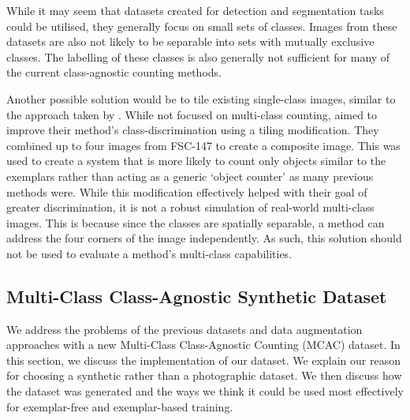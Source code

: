 \documentclass[../thesis.tex]{subfiles}
\begin{document}
While it may seem that datasets created for detection and segmentation tasks could be utilised, they generally focus on small sets of classes. Images from these datasets are also not likely to be separable into sets with mutually exclusive classes. The labelling of these classes is also generally not sufficient for many of the current class-agnostic counting methods.

Another possible solution would be to tile existing single-class images, similar to the approach taken by \citet{liu2022countr}.
While not focused on multi-class counting, \citet{liu2022countr} aimed to improve their method's class-discrimination using a tiling modification. They combined up to four images from FSC-147 to create a composite image. This was used to create a system that is more likely to count only objects similar to the exemplars rather than acting as a generic `object counter'  as many previous methods were. While this modification effectively helped with their goal of greater discrimination, it is not a robust simulation of real-world multi-class images.
This is because since the classes are spatially separable, a method can address the four corners of the image independently.
As such, this solution should not be used to evaluate a method's multi-class capabilities. 






































\subsection{Multi-Class Class-Agnostic Synthetic Dataset}
We address the problems of the previous datasets and data augmentation approaches with a new Multi-Class Class-Agnostic Counting (MCAC) dataset.
In this section, we discuss the implementation of our dataset. We explain our reason for choosing a synthetic rather than a photographic dataset.
We then discuss how the dataset was generated and the ways we think it could be used most effectively for exemplar-free and exemplar-based training. 
\end{document}
